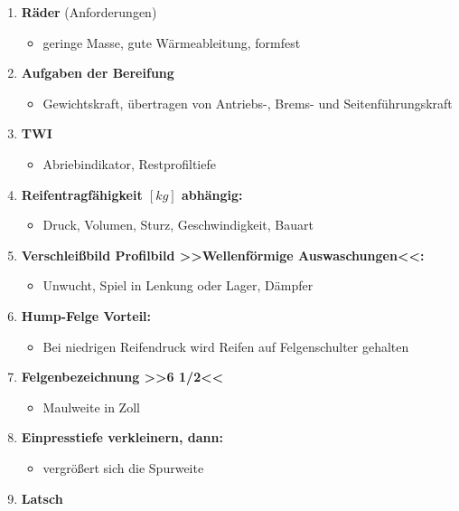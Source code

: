 \begin{enumerate}
\item
  \textbf{Räder} (Anforderungen)

  \begin{itemize}
  \item
    geringe Masse, gute Wärmeableitung, formfest
  \end{itemize}
\item
  \textbf{Aufgaben der Bereifung}

  \begin{itemize}
  \item
    Gewichtskraft, übertragen von Antriebs-, Brems- und
    Seitenführungskraft
  \end{itemize}
\item
  \textbf{TWI}

  \begin{itemize}
  \item
    Abriebindikator, Restprofiltiefe
  \end{itemize}
\item
  \textbf{Reifentragfähigkeit $[kg]$ abhängig:}

  \begin{itemize}
  \item
    Druck, Volumen, Sturz, Geschwindigkeit, Bauart
  \end{itemize}
\item
  \textbf{Verschleißbild Profilbild >>Wellenförmige Auswaschungen<<:}

  \begin{itemize}
  \item
    Unwucht, Spiel in Lenkung oder Lager, Dämpfer
  \end{itemize}
\item
  \textbf{Hump-Felge Vorteil:}

  \begin{itemize}
  \item
    Bei niedrigen Reifendruck wird Reifen auf Felgenschulter gehalten
  \end{itemize}
\item
  \textbf{Felgenbezeichnung >>6 1/2<<}

  \begin{itemize}
  \item
    Maulweite in Zoll
  \end{itemize}
\item
  \textbf{Einpresstiefe verkleinern, dann:}

  \begin{itemize}
  \item
    vergrößert sich die Spurweite
  \end{itemize}
\item
  \textbf{Latsch}


\end{enumerate}
